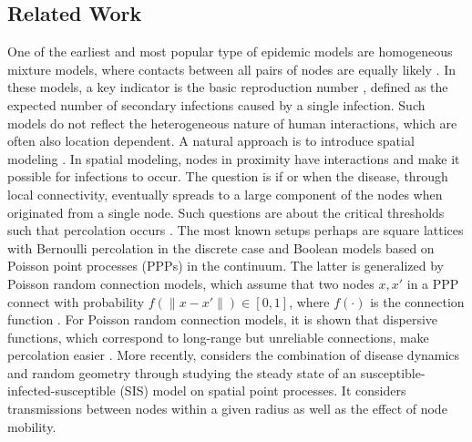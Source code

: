 \subsection{Related Work}
One of the earliest and most popular type of epidemic models are homogeneous mixture models, where contacts between all pairs of nodes are equally likely \cite{newman2018networks,pastor2015epidemic}. In these models, a key indicator is the basic reproduction number \cite{Delamater2019ComplexityOT}, defined as the expected number of secondary infections caused by a single infection. Such models do not reflect the heterogeneous nature of human interactions, which are often also location dependent.
A natural approach is to introduce spatial modeling \cite{Li2011TheFO,pastor2015epidemic,BARTHELEMY20111,katori2021continuum}. In spatial modeling, nodes in proximity have interactions and make it possible for infections to occur. The question is if or when the disease, through local connectivity, eventually spreads to a large component of the nodes when originated from a single node. Such questions are about the critical thresholds such that percolation occurs \cite{frisch1963percolation}.
The most known setups perhaps are square lattices with Bernoulli percolation in the discrete case and Boolean models based on Poisson point processes (PPPs) in the continuum. 
The latter is generalized by Poisson random connection models, which assume that two nodes $x,x'$ in a PPP connect with probability $f(\|x-x'\|)\in[0,1]$, where $f(\cdot)$ is the connection function \cite[Chapter 6]{MeesterRonald1996CP}. {For Poisson random connection models, it is shown that dispersive functions, which correspond to long-range but  unreliable connections, make 
percolation easier }\cite{Franceschetti05continuumpercolation,penrose1993spread}.
More recently, \cite{baccelli2020computational1} considers the combination of disease dynamics and random geometry through studying the steady state of an susceptible-infected-susceptible (SIS) model on spatial point processes. It considers transmissions between nodes within a given radius as well as the effect of node mobility.
 
 

